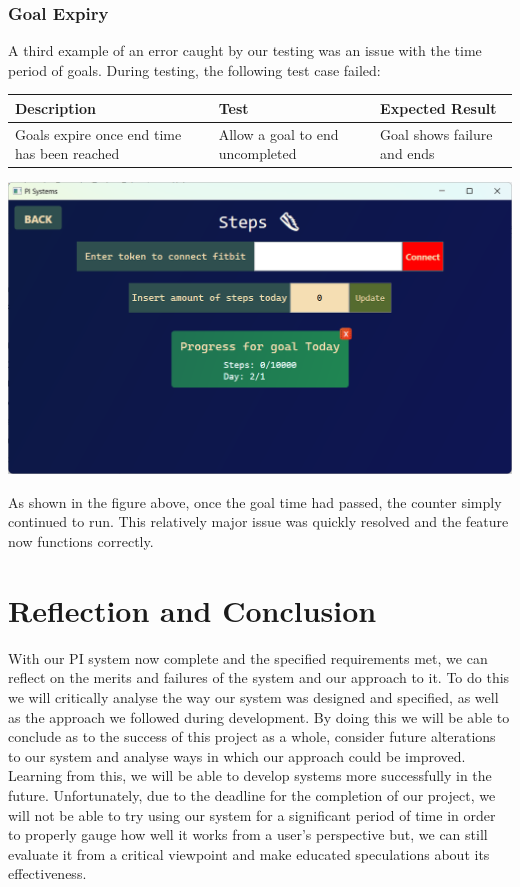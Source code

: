 \documentclass[12pt]{article}
\begin{document}
\subsubsection{Goal Expiry}
A third example of an error caught by our testing was an issue with the 
time period of goals. During testing, the following test case failed:\par
\begin{center}
    \begin{tabular}{|p{5cm}|p{5cm}|p{5cm}|}
        \hline
        \textbf{Description} & \textbf{Test} & \textbf{Expected Result}\\
        \hline
        Goals expire once end time has been reached 
        & Allow a goal to end uncompleted 
        & Goal shows failure and ends\\
        \hline
    \end{tabular}
\end{center}
\begin{center}
    \includegraphics[width=0.8\linewidth]{goalNotExpiring.png}
\end{center}
As shown in the figure above, once the goal time had passed, the counter 
simply continued to run. This relatively major issue was quickly resolved 
and the feature now functions correctly.\par


\section{Reflection and Conclusion}

With our PI system now complete and the specified requirements met, we can 
reflect on the merits and failures of the system and our approach to it. To do 
this we will critically analyse the way our system was designed and specified, 
as well as the approach we followed during development. By doing this we will 
be able to conclude as to the success of this project as a whole, consider 
future alterations to our system and analyse ways in which our approach could 
be improved. Learning from this, we will be able to develop systems more 
successfully in the future. Unfortunately, due to the deadline for the 
completion of our  project, we will not be able to try using our system for a 
significant period of time in order to properly gauge how well it works from 
a user's perspective but, we can still evaluate it from a critical viewpoint 
and make educated speculations about its effectiveness.\par
\end{document}
